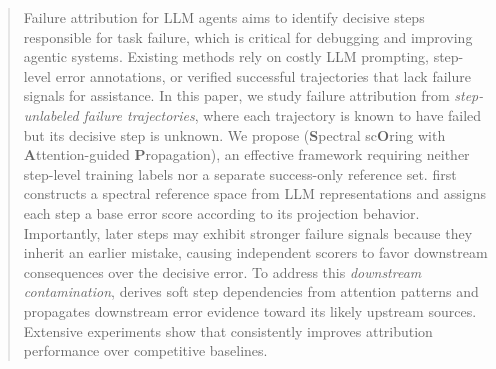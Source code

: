 \begin{abstract}

Failure attribution for LLM agents aims to identify  decisive steps responsible for task failure, which is critical for debugging and improving agentic systems. Existing methods rely on costly LLM prompting, step-level error annotations, or verified successful trajectories that lack failure signals for assistance. In this paper, we study failure attribution from \emph{step-unlabeled failure trajectories}, where each trajectory is known to have failed but its decisive step is unknown. We propose \soap (\textbf{S}pectral sc\textbf{O}ring with
 \textbf{A}ttention-guided \textbf{P}ropagation), an effective framework requiring neither step-level training labels nor a separate success-only reference set. \soap first constructs a spectral reference space from LLM representations and assigns each step a base error score according to its projection behavior. Importantly, later steps may exhibit stronger failure signals because they inherit an earlier mistake, causing independent scorers to favor downstream consequences over the decisive error. To address this \emph{downstream contamination}, \soap derives soft step dependencies from attention patterns and propagates downstream error evidence toward its likely upstream sources. Extensive experiments show that  \soap consistently improves attribution performance over competitive baselines.


\end{abstract}